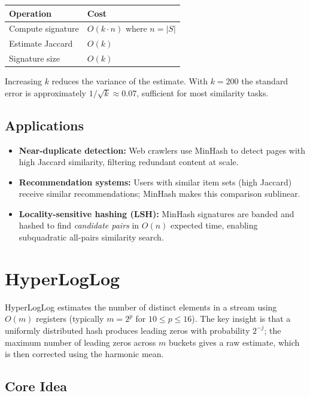\begin{center}
\begin{tabular}{ll}
\toprule
Operation & Cost \\
\midrule
Compute signature & $O(k \cdot n)$ where $n = |S|$ \\
Estimate Jaccard & $O(k)$ \\
Signature size & $O(k)$ \\
\bottomrule
\end{tabular}
\end{center}

\noindent Increasing $k$ reduces the variance of the estimate. With $k = 200$ the standard error is approximately $1/\sqrt{k} \approx 0.07$, sufficient for most similarity tasks.

\subsection{Applications}

\begin{itemize}
    \item \textbf{Near-duplicate detection:} Web crawlers use MinHash to detect pages with high Jaccard similarity, filtering redundant content at scale.
    \item \textbf{Recommendation systems:} Users with similar item sets (high Jaccard) receive similar recommendations; MinHash makes this comparison sublinear.
    \item \textbf{Locality-sensitive hashing (LSH):} MinHash signatures are banded and hashed to find \emph{candidate pairs} in $O(n)$ expected time, enabling subquadratic all-pairs similarity search.
\end{itemize}

\section{HyperLogLog}

HyperLogLog estimates the number of distinct elements in a stream using $O(m)$ registers (typically $m = 2^p$ for $10 \le p \le 16$). The key insight is that a uniformly distributed hash produces leading zeros with probability $2^{-j}$; the maximum number of leading zeros across $m$ buckets gives a raw estimate, which is then corrected using the harmonic mean.

\subsection{Core Idea}

